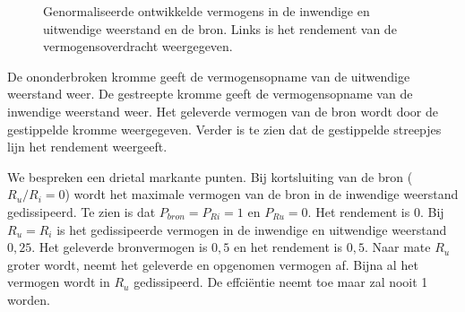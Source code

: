 \begin{figure}[!ht]
\centering
{}
\caption{Genormaliseerde ontwikkelde vermogens in de inwendige en uitwendige weerstand en de bron. Links is het rendement van de vermogensoverdracht weergegeven.}
\label{fig:gelbeschikbarevermogenseneff}
\end{figure}

De ononderbroken kromme geeft de vermogensopname van de uitwendige weerstand weer. De gestreepte
kromme geeft de vermogensopname van de inwendige weerstand weer. Het geleverde vermogen van de
bron wordt door de gestippelde kromme weergegeven. Verder is te zien dat de gestippelde
streepjes lijn het rendement weergeeft.

We bespreken een drietal markante punten.
Bij kortsluiting van de bron ($R_u/R_i=0$) wordt het maximale vermogen van de bron in de inwendige
weerstand gedissipeerd. Te zien is dat $P_{bron} = P_{Ri} = 1$ en $P_{Ru} = 0$. Het rendement is 0.
Bij $R_u=R_i$ is het gedissipeerde vermogen in de inwendige en uitwendige weerstand $0,25$. Het geleverde
bronvermogen is $0,5$ en het rendement is $0,5$. Naar mate $R_u$ groter wordt, neemt het geleverde
en opgenomen vermogen af. Bijna al het vermogen wordt in $R_u$ gedissipeerd. De effci\"entie neemt toe
maar zal nooit 1 worden.

